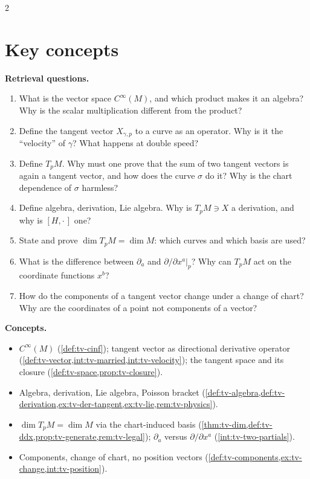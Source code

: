 \begin{paracol}{2}
\section*{Key concepts}
\begin{keyconcepts}
\textbf{Retrieval questions.}
\begin{enumerate}
  \item What is the vector space $C^\infty(M)$, and which product makes it an algebra? Why is the scalar multiplication different from the product?
  \item Define the tangent vector $X_{\gamma,p}$ to a curve as an operator. Why is it the ``velocity'' of $\gamma$? What happens at double speed?
  \item Define $T_pM$. Why must one prove that the sum of two tangent vectors is again a tangent vector, and how does the curve $\sigma$ do it? Why is the chart dependence of $\sigma$ harmless?
  \item Define algebra, derivation, Lie algebra. Why is $T_pM\ni X$ a derivation, and why is $[H,\cdot\,]$ one?
  \item State and prove $\dim T_pM=\dim M$: which curves and which basis are used?
  \item What is the difference between $\partial_a$ and $\partial/\partial x^a|_p$? Why can $T_pM$ act on the coordinate functions $x^b$?
  \item How do the components of a tangent vector change under a change of chart? Why are the coordinates of a point not components of a vector?
\end{enumerate}
\textbf{Concepts.}
\begin{itemize}
  \item $C^\infty(M)$ (\cref{def:tv-cinf}); tangent vector as directional derivative operator (\cref{def:tv-vector,int:tv-married,int:tv-velocity}); the tangent space and its closure (\cref{def:tv-space,prop:tv-closure}).
  \item Algebra, derivation, Lie algebra, Poisson bracket (\cref{def:tv-algebra,def:tv-derivation,ex:tv-der-tangent,ex:tv-lie,rem:tv-physics}).
  \item $\dim T_pM=\dim M$ via the chart-induced basis (\cref{thm:tv-dim,def:tv-ddx,prop:tv-generate,rem:tv-legal}); $\partial_a$ versus $\partial/\partial x^a$ (\cref{int:tv-two-partials}).
  \item Components, change of chart, no position vectors (\cref{def:tv-components,ex:tv-change,int:tv-position}).
\end{itemize}
\end{keyconcepts}

\flushside
\end{paracol}
